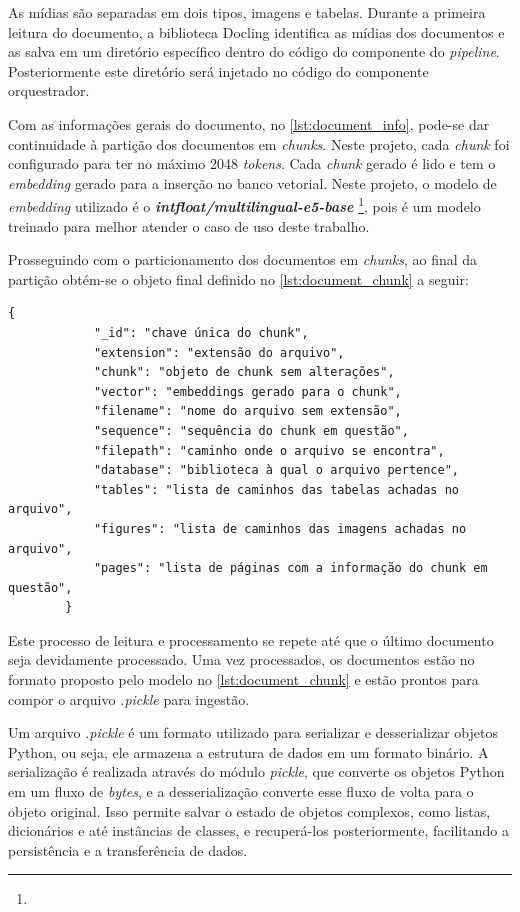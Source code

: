 \documentclass[a4paper, 12pt]{article}
\begin{document}
    As mídias são separadas em dois tipos, imagens e tabelas. Durante a primeira leitura do documento, a biblioteca Docling identifica as mídias dos documentos e as salva em um diretório específico dentro do código do componente do \textit{pipeline}. Posteriormente este diretório será injetado no código do componente orquestrador.

    Com as informações gerais do documento, no \autoref{lst:document_info}, pode-se dar continuidade à partição dos documentos em \textit{chunks}. Neste projeto, cada \textit{chunk} foi configurado para ter no máximo 2048 \textit{tokens}. Cada \textit{chunk} gerado é lido e tem o \textit{embedding} gerado para a inserção no banco vetorial. Neste projeto, o modelo de \textit{embedding} utilizado é o \textit{\textbf{intfloat/multilingual-e5-base}} \footnote{}, pois é um modelo treinado para melhor atender o caso de uso deste trabalho.
    
    Prosseguindo com o particionamento dos documentos em \textit{chunks}, ao final da partição obtém-se o objeto final definido no \autoref{lst:document_chunk} a seguir:

    \clearpage

    \begin{lstlisting}[caption={Objeto de dados para inserção no banco vetorial.}, label={lst:document_chunk}]
        {
            "_id": "chave única do chunk",
            "extension": "extensão do arquivo",
            "chunk": "objeto de chunk sem alterações",
            "vector": "embeddings gerado para o chunk",
            "filename": "nome do arquivo sem extensão",
            "sequence": "sequência do chunk em questão",
            "filepath": "caminho onde o arquivo se encontra",
            "database": "biblioteca à qual o arquivo pertence",
            "tables": "lista de caminhos das tabelas achadas no arquivo",
            "figures": "lista de caminhos das imagens achadas no arquivo",
            "pages": "lista de páginas com a informação do chunk em questão",
        }
    \end{lstlisting}

    Este processo de leitura e processamento se repete até que o último documento seja devidamente processado. Uma vez processados, os documentos estão no formato proposto pelo modelo no \autoref{lst:document_chunk} e estão prontos para compor o arquivo \textit{.pickle} para ingestão. 
    
    Um arquivo \textit{.pickle} é um formato utilizado para serializar e desserializar objetos Python, ou seja, ele armazena a estrutura de dados em um formato binário. A serialização é realizada através do módulo \textit{pickle}, que converte os objetos Python em um fluxo de \textit{bytes}, e a desserialização converte esse fluxo de volta para o objeto original. Isso permite salvar o estado de objetos complexos, como listas, dicionários e até instâncias de classes, e recuperá-los posteriormente, facilitando a persistência e a transferência de dados.
\end{document}

